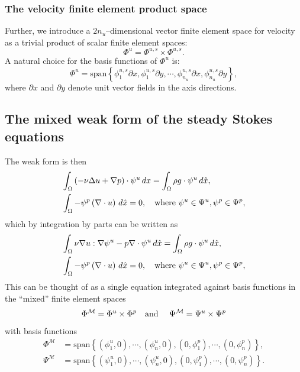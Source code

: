 \subsubsection{The velocity finite element product space }
Further, we introduce a $2n_u$--dimensional vector finite element space for velocity as a trivial product of scalar finite element spaces:
$$
    \Phi^u = \Phi^{u,s} \times \Phi^{u,s}.
$$
A natural choice for the basis functions of $\Phi^u$ is:
    $$\Phi^u = \text{span}\left\{\phi_1^{u,s}\partial x, \phi_1^{u,s}\partial y,
    \cdots,
    \phi_{n_u}^{u,s}\partial x, \phi_{n_u}^{u,s}\partial y
\right\},$$
where $\partial x$ and $\partial y$ denote unit vector fields in the axis directions.

\subsection{The mixed weak form of the steady Stokes equations}
The weak form is then
\begin{equation*}
\begin{split}
    &\int_{\Omega} \left(-\nu\Delta u + \nabla p\right)\cdot \psi^u\,dx = \int_\Omega \rho g\cdot\psi^u\,d\hat{x},\\
    &\int_{\Omega} -\psi^p\left(\nabla\cdot u\right)\,d\hat{x} = 0, \quad\text{where $\psi^u \in \Psi^u, \psi^p \in \Psi^p$},
\end{split}
\end{equation*}
which by integration by parts can be written as
\begin{equation}\label{steady_stokes_weak}
\begin{split}
    &\int_{\Omega} \nu\nabla u : \nabla \psi^u - p\nabla\cdot \psi^u\,d\hat{x} = \int_{\Omega} \rho g \cdot \psi^u\,d\hat{x},\\
    &\int_{\Omega} -\psi^p\left(\nabla\cdot u\right)\,d\hat{x} = 0, \quad\text{where $\psi^u \in \Psi^u, \psi^p \in \Psi^p$},
\end{split}
\end{equation}
This can be thought of as a single equation integrated against basis functions in the ``mixed'' finite element spaces
    $$\Phi^\mathcal{M} = \Phi^u \times \Phi^p \text{\quad and \quad} \Psi^\mathcal{M} = \Psi^u \times \Psi^p$$
with basis functions
\begin{equation}\label{mixed_space_basis_functions}
\begin{split}
    \Phi^\mathcal{M} &= \text{span}\left\{
        (\phi^u_1, 0),\cdots,(\phi^u_n, 0), (0,\phi_1^p),\cdots,(0,\phi_n^p)
    \right\},\\
    \Psi^\mathcal{M} &= \text{span}\left\{
        (\psi^u_1, 0),\cdots,(\psi^u_n, 0), (0,\psi_1^p),\cdots,(0,\psi_n^p)
    \right\}.
\end{split}
\end{equation}
